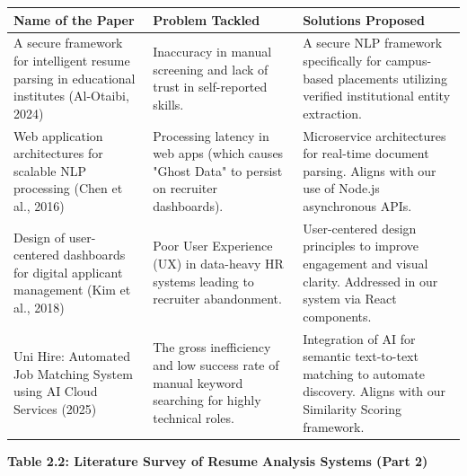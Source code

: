 \documentclass[12pt,a4paper]{report}
\begin{document}
\begin{table}[htbp]
\centering
\normalsize 
\setlength{\tabcolsep}{6pt} 
\renewcommand{\arraystretch}{1.5} 

\begin{tabularx}{\textwidth}{|X|X|X|}
\hline
\textbf{Name of the Paper} & \textbf{Problem Tackled} & \textbf{Solutions Proposed} \\
\hline
A secure framework for intelligent resume parsing in educational institutes (Al-Otaibi, 2024)
& Inaccuracy in manual screening and lack of trust in self-reported skills.
& A secure NLP framework specifically for campus-based placements utilizing verified institutional entity extraction. \\
\hline
Web application architectures for scalable NLP processing (Chen et al., 2016)
& Processing latency in web apps (which causes "Ghost Data" to persist on recruiter dashboards).
& Microservice architectures for real-time document parsing. Aligns with our use of Node.js asynchronous APIs. \\
\hline
Design of user-centered dashboards for digital applicant management (Kim et al., 2018)
& Poor User Experience (UX) in data-heavy HR systems leading to recruiter abandonment.
& User-centered design principles to improve engagement and visual clarity. Addressed in our system via React components. \\
\hline
Uni Hire: Automated Job Matching System using AI Cloud Services (2025)
& The gross inefficiency and low success rate of manual keyword searching for highly technical roles.
& Integration of AI for semantic text-to-text matching to automate discovery. Aligns with our Similarity Scoring framework. \\
\hline
\end{tabularx}
\end{table}

\vspace{1cm}

\begin{center}
\textbf{Table 2.2: Literature Survey of Resume Analysis Systems (Part 2)}
\end{center}
\end{document}
